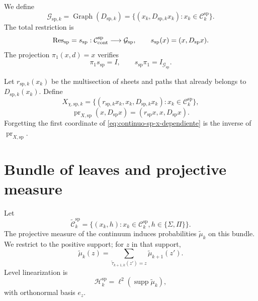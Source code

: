 We define
\begin{equation}
\label{eq:continuo-sp-g-graph}
 \mathcal G_{\mathrm{sp},k}
 =\operatorname{Graph}(D_{\mathrm{sp},k})
 =\{(x_k,D_{\mathrm{sp},k}x_k):
     x_k\in\mathcal C_k^{\mathrm{sp}}\}.
\end{equation}
The total restriction is
\begin{equation}
\label{eq:continuo-sp-res-graph}
 \operatorname{Res}_{\mathrm{sp}}=s_{\mathrm{sp}}:
 \mathcal C_{\rm cont}^{\mathrm{sp}}
 \longrightarrow\mathcal G_{\mathrm{sp}},
 \qquad
 s_{\mathrm{sp}}(x)=(x,D_{\mathrm{sp}}x).
\end{equation}
The projection \(\pi_1(x,d)=x\) verifies
\begin{equation}
\label{eq:continuo-sp-res-inversa}
 \pi_1s_{\mathrm{sp}}=I,
 \qquad
 s_{\mathrm{sp}}\pi_1=I_{\mathcal G_{\mathrm{sp}}}.
\end{equation}

Let \(r_{\mathrm{sp},k}(x_k)\) be the multisection of sheets and paths that already
belongs to \(D_{\mathrm{sp},k}(x_k)\). Define
\begin{equation}
\label{eq:continuo-sp-x-dependiente}
 X_{\chi,\mathrm{sp},k}
 =\{(r_{\mathrm{sp},k}x_k,x_k,D_{\mathrm{sp},k}x_k):
     x_k\in\mathcal C_k^{\mathrm{sp}}\},
\end{equation}
\begin{equation}
\label{eq:continuo-sp-pr-x}
 \operatorname{pr}_{X,\mathrm{sp}}(x,D_{\mathrm{sp}}x)
 =(r_{\mathrm{sp}}x,x,D_{\mathrm{sp}}x).
\end{equation}
Forgetting the first coordinate of
\eqref{eq:continuo-sp-x-dependiente} is the inverse of
\(\operatorname{pr}_{X,\mathrm{sp}}\).

\section{Bundle of leaves and projective measure}

Let
\begin{equation}
\label{eq:continuo-sp-haz-hojas}
 \widetilde{\mathcal C}_k^{\mathrm{sp}}
 =\{(x_k,h):x_k\in\mathcal C_k^{\mathrm{sp}},
              h\in\{\Sigma,\Pi\}\}.
\end{equation}
The projective measure of the continuum induces probabilities
\(\widetilde\mu_k\) on this bundle. We restrict to the positive support; for
\(z\) in that support,
\begin{equation}
\label{eq:continuo-sp-consistencia-medida}
 \widetilde\mu_k(z)
 =\sum_{\widetilde\tau_{k+1,k}(z')=z}
  \widetilde\mu_{k+1}(z').
\end{equation}
Level linearization is
\begin{equation}
\label{eq:continuo-sp-hilbert-nivel}
 \mathcal H_k^{\mathrm{sp}}
 =\ell^2(\operatorname{supp}\widetilde\mu_k),
\end{equation}
with orthonormal basis \(e_z\).

